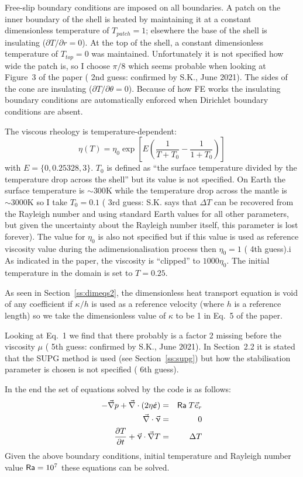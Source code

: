 Free-slip boundary conditions are imposed on all boundaries.
A patch on the inner boundary of the shell is heated by
maintaining it at a constant dimensionless temperature of $T_{patch}=1$; 
elsewhere the base of the shell is insulating ($\partial T/\partial r = 0$).
At the top of the shell, a constant dimensionless temperature of $T_{top}=0$ was maintained.
Unfortunately it is not specified how wide the patch is, so I choose 
$\pi/8$ which seems probable when looking at 
Figure~3 of the paper ({\color{orange} 2nd guess}: confirmed by S.K., June 2021).
The sides of the cone are insulating ($\partial T/\partial \theta =0$).
Because of how FE works the insulating boundary conditions are automatically enforced 
when Dirichlet boundary conditions are absent. 

The viscous rheology is temperature-dependent:
\[
\eta(T) =\eta_0 \exp\left[ E \left( \frac{1}{T+T_0} -\frac{1}{1+T_0}  \right)   \right]
\]
with $E= \{0,0.25328,3\}$. $T_0$ is defined as ``the surface temperature divided by the temperature
drop across the shell'' but its value is not specified. On Earth the surface temperature 
is $\sim300\si{\kelvin}$
while the temperature drop across the mantle is $\sim3000\si{\kelvin}$ 
so I take $T_0=0.1$ ({\color{orange} 3rd guess}: S.K. says that $\Delta T$ can be recovered from 
the Rayleigh number and using standard Earth values for all other parameters, but given the uncertainty about 
the Rayleigh number itself, this parameter is lost forever).
The value for $\eta_0$ is also not specified but if this value is used as reference viscosity value 
during the adimensionalisation process then $\eta_0=1$ ({\color{orange} 4th guess}).i
As indicated in the paper, the viscosity is ``clipped'' to $1000\eta_0$.
The initial temperature in the domain is set to $T=0.25$.

As seen in Section~\ref{ss:dimeqs2}, the dimensionless heat transport equation is void of any coefficient if 
$\kappa/h$ is used as a reference velocity (where $h$ is a reference length) so we take the 
dimensionless value of $\kappa$ to be 1 in Eq.~5 of the paper.   

Looking at Eq.~1 we find that there probably is a factor 2 missing before 
the viscosity $\mu$ ({\color{orange} 5th guess}: confirmed by S.K., June 2021).
In Section~2.2 it is stated that the SUPG method is used (see Section~\ref{ss:supg}) 
but how the stabilisation parameter
is chosen is not specified ({\color{orange} 6th guess}).

In the end the set of equations solved by the code is as follows:
\begin{eqnarray}
-\vec\nabla p + \vec\nabla \cdot(2 \eta \dot{\bm \varepsilon} ) &=& {\mathsf{Ra}} \; T \vec{e}_r \\
\vec\nabla\cdot\vec\upnu &=& 0 \\
\frac{\partial T}{\partial t} + \vec\upnu\cdot\vec\nabla T &=& \Delta T 
\end{eqnarray}
Given the above boundary conditions, initial temperature and Rayleigh number value ${\mathsf{Ra}}=10^7$ these
equations can be solved. 

